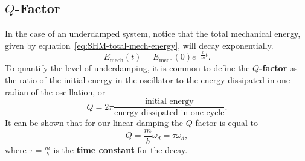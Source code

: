 \documentclass[../classical_mechanics.tex]{subfiles}
\begin{document}
        \subsection{$Q$-Factor}\label{subsec:Q-factor}
            In the case of an underdamped system, notice that the total mechanical energy, given by equation~\ref{eq:SHM-total-mech-energy}, will decay exponentially.
            \begin{equation}
                E_\text{mech}(t)=E_\text{mech}(0)e^{-\frac{b}{m}t}.
            \end{equation}
            To quantify the level of underdamping, it is common to define the \textbf{$Q$-factor} as the ratio of the initial energy in the oscillator to the energy dissipated in one radian of the oscillation, or
            \begin{equation}
                Q=2\pi\frac{\text{initial energy}}{\text{energy dissipated in one cycle}}.
            \end{equation}
            It can be shown that for our linear damping the $Q$-factor is equal to
            \begin{equation}
                Q=\frac{m}{b}\omega_d=\tau\omega_d,
            \end{equation}
            where $\tau=\frac{m}{b}$ is the \textbf{time constant} for the decay.

\end{document}
